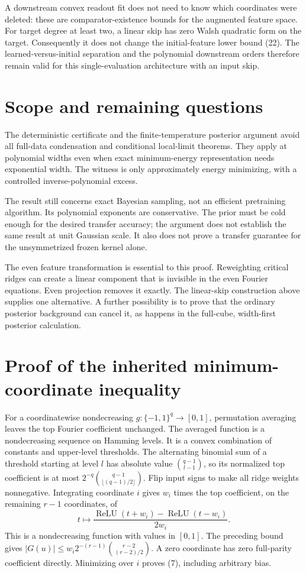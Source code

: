 \documentclass[11pt]{article}
\newcommand{\relu}{\operatorname{ReLU}}
\begin{document}
A downstream convex readout fit does not need to know which coordinates
were deleted: these are comparator-existence bounds for the augmented
feature space. For target degree at least two, a linear skip has zero
Walsh quadratic form on the target. Consequently it does not change the
initial-feature lower bound (22). The learned-versus-initial separation
and the polynomial downstream orders therefore remain valid for this
single-evaluation architecture with an input skip.



\section{Scope and remaining questions}
The deterministic certificate and the finite-temperature posterior
argument avoid all full-data condensation and conditional local-limit
theorems. They apply at polynomial widths even when exact minimum-energy
representation needs exponential width. The witness is only approximately
energy minimizing, with a controlled inverse-polynomial excess.

The result still concerns exact Bayesian sampling, not an efficient
pretraining algorithm. Its polynomial exponents are conservative. The
prior must be cold enough for the desired transfer accuracy; the argument
does not establish the same result at unit Gaussian scale. It also does
not prove a transfer guarantee for the unsymmetrized frozen kernel alone.

The even feature transformation is essential to this proof. Reweighting
critical ridges can create a linear component that is invisible in the
even Fourier equations. Even projection removes it exactly. The linear-skip construction above supplies one alternative. A further
possibility is to prove that the ordinary posterior background can cancel
it, as happens in the full-cube, width-first posterior calculation.

\section*{Proof of the inherited minimum-coordinate inequality}
For a coordinatewise nondecreasing $g:\{-1,1\}^q\to[0,1]$, permutation
averaging leaves the top Fourier coefficient unchanged. The averaged
function is a nondecreasing sequence on Hamming levels. It is a convex
combination of constants and upper-level thresholds. The alternating
binomial sum of a threshold starting at level $l$ has absolute value
$\binom{q-1}{l-1}$, so its normalized top coefficient is at most
$2^{-q}\binom{q-1}{\lfloor(q-1)/2\rfloor}$.
Flip input signs to make all ridge weights nonnegative. Integrating
coordinate $i$ gives $w_i$ times the top coefficient, on the remaining
$r-1$ coordinates, of
\[
 t\longmapsto\frac{\relu(t+w_i)-\relu(t-w_i)}{2w_i}.
\]
This is a nondecreasing function with values in $[0,1]$.
The preceding bound gives
$|G(u)|\le w_i2^{-(r-1)}\binom{r-2}{(r-2)/2}$.
A zero coordinate has zero full-parity coefficient directly. Minimizing
over $i$ proves (7), including arbitrary bias.
\end{document}
